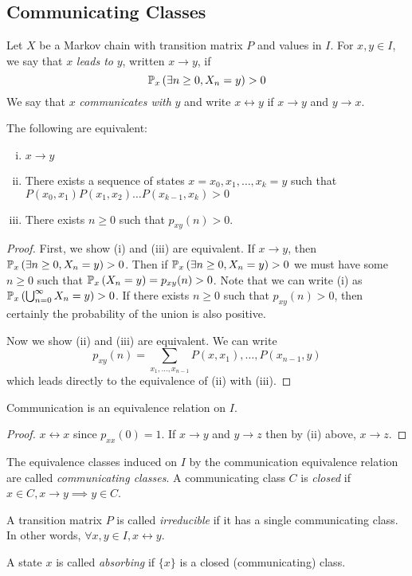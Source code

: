 \subsection{Communicating Classes}
\begin{definition}
Let \( X \) be a Markov chain with transition matrix \( P \) and values in \( I \).
For \( x, y \in I \), we say that \( x \) \textit{leads to} \( y \), written \( x \to y \), if
\[ \mathbb{P}_{x}\left({\exists n \geq 0, X_n = y}\right) > 0 \]
We say that \( x \) \textit{communicates with} \( y \) and write \( x \leftrightarrow y \) if \( x \to y \) and \( y \to x \).
\end{definition}
\begin{theorem}
The following are equivalent:
\begin{enumerate}[(i)]
\item \( x \to y \)
\item There exists a sequence of states \( x = x_0, x_1, \dots, x_k = y \) such that \( P(x_0, x_1)P(x_1,x_2)\dots P(x_{k-1},x_k) > 0 \)
\item There exists \( n \geq 0 \) such that \( p_{xy}(n) > 0 \).
\end{enumerate}
\end{theorem}
\begin{proof}
First, we show (i) and (iii) are equivalent.
If \( x \to y \), then \( \mathbb{P}_{x}\left({\exists n \geq 0, X_n = y}\right) > 0 \).
Then if \( \mathbb{P}_{x}\left({\exists n \geq 0, X_n = y}\right) > 0 \) we must have some \( n \geq 0 \) such that \( \mathbb{P}_{x}\left({X_n = y}\right) = p_{xy}(n) > 0 \).
Note that we can write (i) as \( \mathbb{P}_{x}\left({\bigcup_{n=0}^\infty X_n = y}\right) > 0 \).
If there exists \( n \geq 0 \) such that \( p_{xy}(n) > 0 \), then certainly the probability of the union is also positive.

Now we show (ii) and (iii) are equivalent.
We can write
\[ p_{xy}(n) = \sum_{x_1, \dots, x_{n-1}} P(x, x_1), \dots, P(x_{n-1}, y) \]
which leads directly to the equivalence of (ii) with (iii).
\end{proof}
\begin{corollary}
Communication is an equivalence relation on \( I \).
\end{corollary}
\begin{proof}
\( x \leftrightarrow x \) since \( p_{xx}(0) = 1 \).
If \( x \to y \) and \( y \to z \) then by (ii) above, \( x \to z \).
\end{proof}
\begin{definition}
The equivalence classes induced on \( I \) by the communication equivalence relation are called \textit{communicating classes}.
A communicating class \( C \) is \textit{closed} if \( x \in C, x \to y \implies y \in C \).
\end{definition}
\begin{definition}
A transition matrix \( P \) is called \textit{irreducible} if it has a single communicating class.
In other words, \( \forall x, y \in I, x \leftrightarrow y \).
\end{definition}
\begin{definition}
A state \( x \) is called \textit{absorbing} if \( \{ x \} \) is a closed (communicating) class.
\end{definition}

